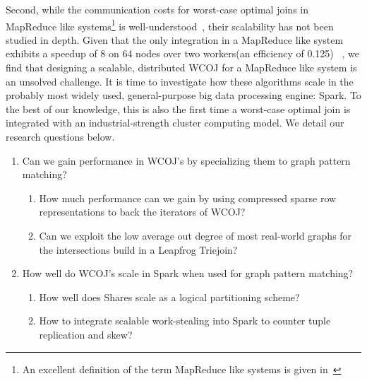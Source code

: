 Second, while the communication costs for worst-case optimal joins in MapReduce like systems\footnote{
An excellent definition of the term MapReduce like systems is given in~\cite{shares}}
is well-understood~\cite{shares,shares-skew,shares-proof,shares-skew-proof},
their scalability has not been studied in depth.
Given that the only integration in a MapReduce like system exhibits a speedup of 8 on 64 nodes over two workers(an efficiency of 0.125)
~\cite{myria-detailed},
we find that designing a scalable, distributed \textsc{WCOJ} for a MapReduce like system is an unsolved challenge.
It is time to investigate how these algorithms scale in the probably most widely used, general-purpose big data processing engine: Spark.
To the best of our knowledge, this is also the first time a worst-case optimal join is integrated with an industrial-strength cluster
computing model.
We detail our research questions below.
\begin{enumerate}
    \item Can we gain performance in \textsc{WCOJ}’s by specializing them to graph pattern matching?
    \begin{enumerate}
        \item How much performance can we gain by using compressed sparse row representations to back the iterators of \textsc{WCOJ}?
        \item Can we exploit the low average out degree of most real-world graphs for the intersections build in a Leapfrog Triejoin?
    \end{enumerate}
    \item How well do \textsc{WCOJ}’s scale in Spark when used for graph pattern matching?
    \begin{enumerate}
        \item How well does Shares scale as a logical partitioning scheme?
        \item How to integrate scalable work-stealing into Spark to counter tuple replication and skew?
    \end{enumerate}
\end{enumerate}

